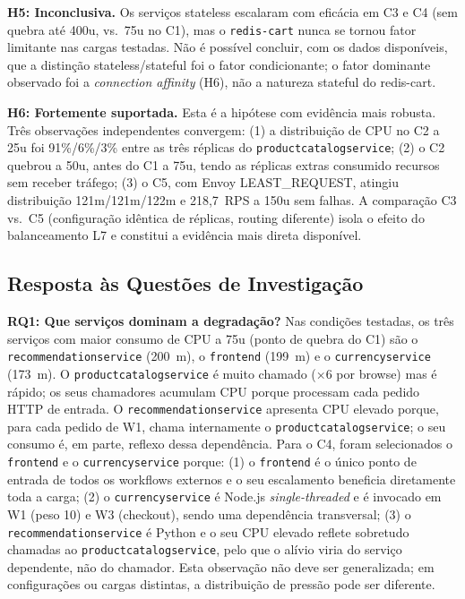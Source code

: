 \documentclass[manuscript,oneside]{acmart}
\begin{document}
\textbf{H5: Inconclusiva.} Os serviços stateless escalaram com eficácia em C3 e C4 (sem quebra até 400u, vs.\ 75u no C1), mas o \texttt{redis-cart} nunca se tornou fator limitante nas cargas testadas. Não é possível concluir, com os dados disponíveis, que a distinção stateless/stateful foi o fator condicionante; o fator dominante observado foi a \textit{connection affinity} (H6), não a natureza stateful do redis-cart.

\textbf{H6: Fortemente suportada.} Esta é a hipótese com evidência mais robusta. Três observações independentes convergem: (1) a distribuição de CPU no C2 a 25u foi 91\%/6\%/3\% entre as três réplicas do \texttt{productcatalogservice}; (2) o C2 quebrou a 50u, antes do C1 a 75u, tendo as réplicas extras consumido recursos sem receber tráfego; (3) o C5, com Envoy LEAST\_REQUEST, atingiu distribuição 121m/121m/122m e 218{,}7~RPS a 150u sem falhas. A comparação C3 vs.\ C5 (configuração idêntica de réplicas, routing diferente) isola o efeito do balanceamento L7 e constitui a evidência mais direta disponível.

\subsection{Resposta às Questões de Investigação}

\textbf{RQ1: Que serviços dominam a degradação?} Nas condições testadas, os três serviços com maior consumo de CPU a 75u (ponto de quebra do C1) são o \texttt{recommendationservice} (200~m), o \texttt{frontend} (199~m) e o \texttt{currencyservice} (173~m). O \texttt{productcatalogservice} é muito chamado (×6 por browse) mas é rápido; os seus chamadores acumulam CPU porque processam cada pedido HTTP de entrada. O \texttt{recommendationservice} apresenta CPU elevado porque, para cada pedido de W1, chama internamente o \texttt{productcatalogservice}; o seu consumo é, em parte, reflexo dessa dependência. Para o C4, foram selecionados o \texttt{frontend} e o \texttt{currencyservice} porque: (1) o \texttt{frontend} é o único ponto de entrada de todos os workflows externos e o seu escalamento beneficia diretamente toda a carga; (2) o \texttt{currencyservice} é Node.js \textit{single-threaded} e é invocado em W1 (peso 10) e W3 (checkout), sendo uma dependência transversal; (3) o \texttt{recommendationservice} é Python e o seu CPU elevado reflete sobretudo chamadas ao \texttt{productcatalogservice}, pelo que o alívio viria do serviço dependente, não do chamador. Esta observação não deve ser generalizada; em configurações ou cargas distintas, a distribuição de pressão pode ser diferente.
\end{document}
